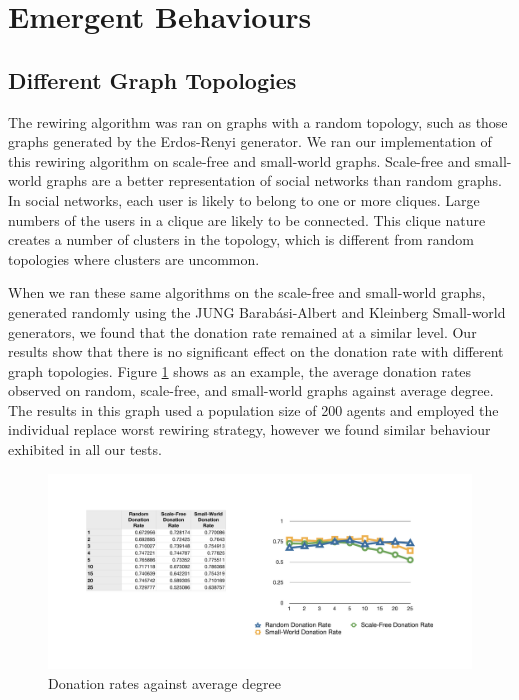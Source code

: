 \section{Emergent Behaviours}

\subsection{Different Graph Topologies}

The rewiring algorithm \cite{aamas2010} was ran on graphs with a random topology, such as those graphs generated by the Erdos-Renyi generator.
We ran our implementation of this rewiring algorithm on scale-free and small-world graphs.
Scale-free and small-world graphs are a better representation of social networks than random graphs.
In social networks, each user is likely to belong to one or more cliques.
Large numbers of the users in a clique are likely to be connected.
This clique nature creates a number of clusters in the topology, which is different from random topologies where clusters are uncommon.

When we ran these same algorithms on the scale-free and small-world graphs, generated randomly using the JUNG Barab\'{a}si-Albert and Kleinberg Small-world generators, we found that the donation rate remained at a similar level.
Our results show that there is no significant effect on the donation rate with different graph topologies.
Figure \ref{fig:donation-rates-scale-and-small-world} shows as an example, the average donation rates observed on random, scale-free, and small-world graphs against average degree.
The results in this graph used a population size of 200 agents and employed the individual replace worst rewiring strategy, however we found similar behaviour exhibited in all our tests.

\begin{figure}[htbp]
	\centering
	\includegraphics[width=0.7\linewidth]{img/small_world_scale_free_donation_rates.pdf}
	\caption{Donation rates against average degree}
	\label{fig:donation-rates-scale-and-small-world}
\end{figure}

